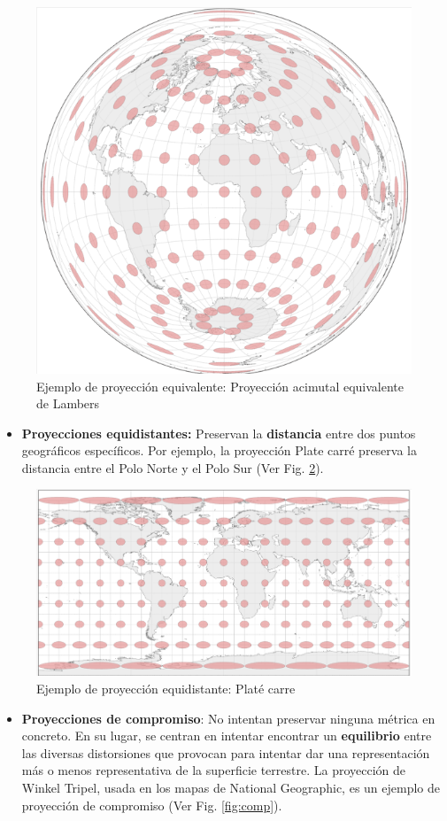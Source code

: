 \documentclass[
]{report}
\providecommand{\tightlist}{%
  \setlength{\itemsep}{0pt}\setlength{\parskip}{0pt}}
\theoremstyle{definition}
\theoremstyle{definition}
\theoremstyle{definition}
\theoremstyle{definition}
\theoremstyle{remark}
\begin{document}
\begin{figure}

{\centering \includegraphics[width=0.3\linewidth]{img/equiv} 

}

\caption{Ejemplo de proyección equivalente: Proyección acimutal equivalente de Lambers}\label{fig:equiv}
\end{figure}

\begin{itemize}
\tightlist
\item
  \textbf{Proyecciones equidistantes:} Preservan la \textbf{distancia} entre dos puntos
  geográficos específicos. Por ejemplo, la proyección Plate carré preserva la
  distancia entre el Polo Norte y el Polo Sur (Ver Fig. \ref{fig:equidist}).
\end{itemize}

\begin{figure}

{\centering \includegraphics[width=0.3\linewidth]{img/equidist} 

}

\caption{Ejemplo de proyección equidistante: Platé carre}\label{fig:equidist}
\end{figure}

\begin{itemize}
\tightlist
\item
  \textbf{Proyecciones de compromiso}: No intentan preservar ninguna métrica en
  concreto. En su lugar, se centran en intentar encontrar un \textbf{equilibrio}
  entre las diversas distorsiones que provocan para intentar dar una
  representación más o menos representativa de la superficie terrestre. La
  proyección de Winkel Tripel, usada en los mapas de National Geographic, es
  un ejemplo de proyección de compromiso (Ver Fig. \ref{fig:comp}).
\end{itemize}
\end{document}
